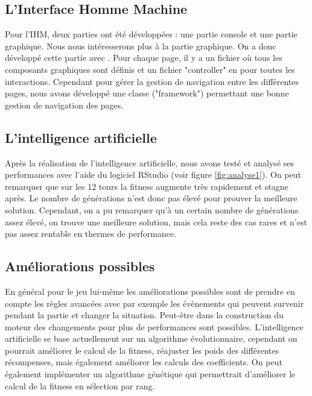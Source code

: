 \subsection{L'Interface Homme Machine}
Pour l'IHM, deux parties ont été développées : une partie console et une partie graphique.
Nous nous intéresserons plus à la partie graphique. On a donc développé cette partie avec \fx. Pour chaque page, il y a un fichier \fxml où tous les composants graphiques sont définis et un fichier "controller" en \java pour toutes les interactions. Cependant pour gérer la gestion de navigation entre les différentes pages, nous avons développé une classe ("framework") permettant une bonne gestion de navigation des pages.
\subsection{L'intelligence artificielle }
Après la réalisation de l'intelligence artificielle, nous avons testé et analysé ses performances avec l'aide du logiciel RStudio (voir figure \ref{fig:analyse1}). On peut remarquer que sur les 12 tours la fitness augmente très rapidement et stagne après. Le nombre de générations n'est donc pas élevé pour prouver la meilleure solution. Cependant, on a pu remarquer qu'à un certain nombre de générations assez élevé, on trouve une meilleure solution, mais cela reste des cas rares et n'est pas assez rentable en thermes de performance.

\subsection{Améliorations possibles}
En général pour le jeu lui-même les améliorations possibles sont de prendre en compte les règles avancées avec par exemple les évènements qui peuvent survenir pendant la partie et changer la situation. Peut-être dans la construction du moteur des changements pour plus de performances sont possibles.
L'intelligence artificielle se base actuellement sur un algorithme évolutionnaire, cependant on pourrait améliorer le calcul de la fitness, réajuster les poids des différentes récompenses, mais également améliorer les calculs des coefficients. On peut également implémenter un algorithme génétique qui permettrait d'améliorer le calcul de la fitness en sélection par rang.
